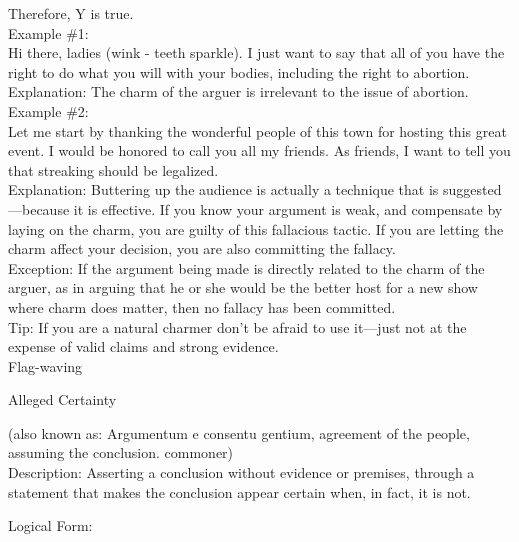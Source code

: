 \documentclass[a4paper,12pt,single,pdftex]{scrartcl}
\begin{document}
    
      Therefore, Y is true.
    \\

    
      Example \#1:
    \\

    
      Hi there, ladies (wink - teeth sparkle). I just want to say that all of you have the right to do what you will with your bodies, including the right to abortion.
    \\

    
      Explanation: The charm of the arguer is irrelevant to the issue of abortion.
    \\

    
      Example \#2:
    \\

    
      Let me start by thanking the wonderful people of this town for hosting this great event.  I would be honored to call you all my friends.  As friends, I want to tell you that streaking should be legalized.
    \\

    
      Explanation: Buttering up the audience is actually a technique that is suggested—because it is effective.  If you know your argument is weak, and compensate by laying on the charm, you are guilty of this fallacious tactic.  If you are letting the charm affect your decision, you are also committing the fallacy.
    \\

    
      Exception: If the argument being made is directly related to the charm of the arguer, as in arguing that he or she would be the better host for a new show where charm does matter, then no fallacy has been committed.
    \\

    
      Tip: If you are a natural charmer don’t be afraid to use it—just not at the expense of valid claims and strong evidence.
    \\

  

Flag-waving

Alleged Certainty
    
      (also known as: Argumentum e consentu gentium, agreement of the people, assuming the conclusion. commoner)
    \\

  
    Description: Asserting a conclusion without evidence or premises, through a statement that makes the conclusion appear certain when, in fact, it is not.

    
      Logical Form:
    \\
\end{document}
